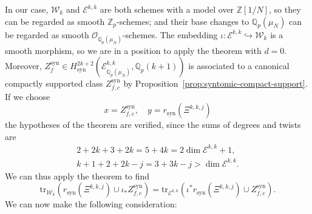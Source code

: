 \documentclass[11pt, a4paper, reqno]{amsart}
\theoremstyle{definition}
\theoremstyle{plain}
\theoremstyle{remark}
\DeclareMathOperator{\syn}{syn}
\newcommand{\numberset}{\mathbb}
\newcommand{\Q}{\numberset{Q}}
\newcommand{\Z}{\numberset{Z}}
\newcommand{\ringint}{\mathcal}
\newcommand{\Ell}{\mathcal{E}}
\newcommand{\KS}{\mathscr{W}}
\newcommand{\cBF}{\Xi}
\newcommand{\regulator}[1]{r_{#1}}
\newcommand{\rsyn}{\regulator{\syn}}
\begin{document}
   In our case, $\KS_k$ and $\Ell^{k,k}$ are both schemes with a model over $\Z[1/N]$, so they can be regarded as smooth $\Z_p$-schemes; and their base changes to $\Q_p(\mu_N)$ can be regarded as smooth $\ringint{O}_{\Q_p(\mu_N)}$-schemes. The embedding $\iota\colon \Ell^{k,k} \hookrightarrow \KS_k$ is a smooth morphism, so we are in a position to apply the theorem with $d=0$. Moreover, $Z_f^{\syn} \in H^{2k+2}_{\syn}(\Ell^{k,k}_{\Q_p(\mu_N)},\Q_p(k+1))$ is associated to a canonical compactly supported class $Z^{\syn}_{f,c}$ by Proposition~\ref{prop:syntomic-compact-support}. If we choose
   \[
       x = Z^{\syn}_{f,c}, \quad y = \rsyn(\cBF^{k,k,j})
   \]
   the hypotheses of the theorem are verified, since the sums of degrees and twists are
   \begin{gather*}
       2+2k+3+2k = 5+4k = 2\dim \Ell^{k,k} +1, \\
       k+1+2+2k-j = 3+3k-j > \dim \Ell^{k,k}.
   \end{gather*}
   We can thus apply the theorem to find
   \[
       \mathrm{tr}_{\KS_k} (\rsyn(\cBF^{k,k,j}) \cup \iota_* Z_{f,c}^{\syn}) = \mathrm{tr}_{\Ell^{k,k}} (\iota^* \rsyn(\cBF^{k,k,j}) \cup Z_{f,c}^{\syn}).
   \]
   We can now make the following consideration:
\end{document}
